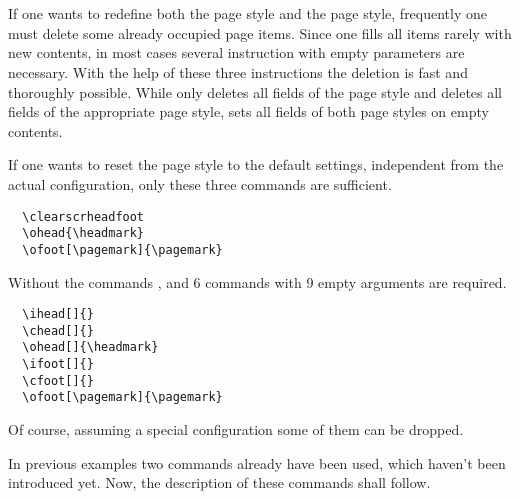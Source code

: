 \begin{Declaration}
  \\
  \\
\end{Declaration}%
%
%
%
If one wants to redefine both the page style 
and the  page style, frequently one must delete 
some already occupied page items. Since one fills all items
rarely with new contents, in most cases several
instruction with empty parameters are necessary.
With the help of these three instructions the deletion is fast and
thoroughly possible.
While  only deletes all fields of the 
page style  and  deletes
all fields of the appropriate  page style,
 sets all fields of both page styles on
empty contents.

\begin{Example}
  If one wants to reset the page style to the default \KOMAScript{} settings,
  independent from the actual configuration, only these three commands are
  sufficient.
\begin{lstlisting}
  \clearscrheadfoot
  \ohead{\headmark}
  \ofoot[\pagemark]{\pagemark}
\end{lstlisting}
  Without the commands ,  and
   6 commands with 9 empty arguments are required.
\begin{lstlisting}
  \ihead[]{}
  \chead[]{}
  \ohead[]{\headmark}
  \ifoot[]{}
  \cfoot[]{}
  \ofoot[\pagemark]{\pagemark}
\end{lstlisting}
  Of course, assuming a special configuration some of them can
  be dropped.%
\end{Example}%
%
%
%
%
%
%
%
%
%
%
%

In previous examples two commands already have been used, which 
haven't been introduced yet. Now, the description of these
commands shall follow.

